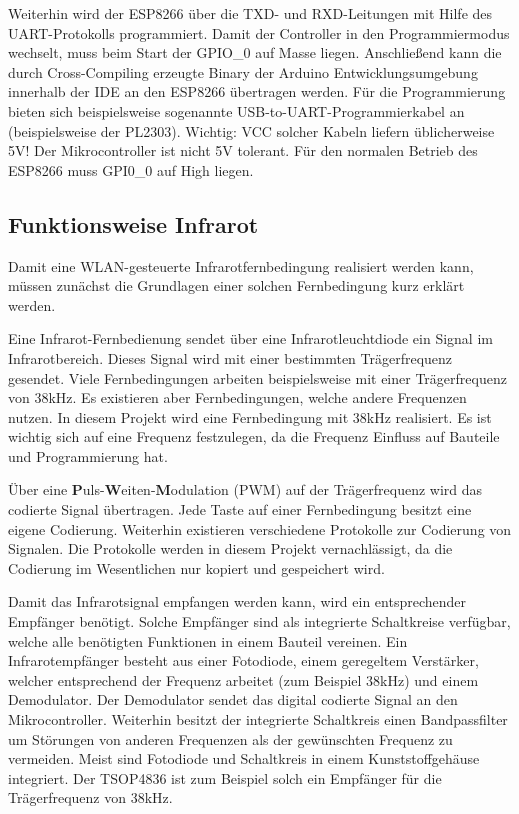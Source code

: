 Weiterhin wird der ESP8266 über die TXD- und RXD-Leitungen mit Hilfe des UART-Protokolls programmiert.
Damit der Controller in den Programmiermodus wechselt, muss beim Start der GPIO\_0 auf Masse liegen.
Anschließend kann die durch Cross-Compiling erzeugte Binary der Arduino Entwicklungsumgebung innerhalb der IDE an den ESP8266 übertragen werden.
Für die Programmierung bieten sich beispielsweise sogenannte USB-to-UART-Programmierkabel an (beispielsweise der PL2303).
Wichtig: VCC solcher Kabeln liefern üblicherweise 5V! Der Mikrocontroller ist nicht 5V tolerant.
Für den normalen Betrieb des ESP8266 muss GPI0\_0 auf High liegen.

\subsection{Funktionsweise Infrarot}
Damit eine WLAN-gesteuerte Infrarotfernbedingung realisiert werden kann, müssen zunächst die Grundlagen einer solchen Fernbedingung kurz erklärt werden.

Eine Infrarot-Fernbedienung sendet über eine Infrarotleuchtdiode ein Signal im Infrarotbereich.
Dieses Signal wird mit einer bestimmten Trägerfrequenz gesendet.
Viele Fernbedingungen arbeiten beispielsweise mit einer Trägerfrequenz von 38kHz.
Es existieren aber Fernbedingungen, welche andere Frequenzen nutzen.
In diesem Projekt wird eine Fernbedingung mit 38kHz realisiert.
Es ist wichtig sich auf eine Frequenz festzulegen, da die Frequenz Einfluss auf Bauteile und Programmierung hat.

Über eine \textbf{P}uls-\textbf{W}eiten-\textbf{M}odulation (PWM) auf der Trägerfrequenz wird das codierte Signal übertragen.
Jede Taste auf einer Fernbedingung besitzt eine eigene Codierung.
Weiterhin existieren verschiedene Protokolle zur Codierung von Signalen.
Die Protokolle werden in diesem Projekt vernachlässigt, da die Codierung im Wesentlichen nur kopiert und gespeichert wird.

Damit das Infrarotsignal empfangen werden kann, wird ein entsprechender Empfänger benötigt.
Solche Empfänger sind als integrierte Schaltkreise verfügbar, welche alle benötigten Funktionen in einem Bauteil vereinen.
Ein Infrarotempfänger besteht aus einer Fotodiode, einem geregeltem Verstärker, welcher entsprechend der Frequenz arbeitet (zum Beispiel 38kHz) und einem Demodulator.
Der Demodulator sendet das digital codierte Signal an den Mikrocontroller.
Weiterhin besitzt der integrierte Schaltkreis einen Bandpassfilter um Störungen von anderen Frequenzen als der gewünschten Frequenz zu vermeiden.
Meist sind Fotodiode und Schaltkreis in einem Kunststoffgehäuse integriert.
Der TSOP4836 ist zum Beispiel solch ein Empfänger für die Trägerfrequenz von 38kHz.

